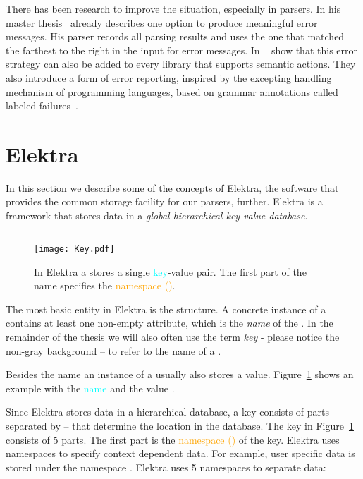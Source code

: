 There has been research to improve the situation, especially in  parsers. In his master thesis~\cite{ford2002packrat} \citeauthor{ford2002packrat} already describes one option to produce meaningful error messages. His parser records all parsing results and uses the one that matched the farthest to the right in the input for error messages. In ~\cite{maidl2016labeled} \citeauthor{maidl2016labeled} show that this error strategy can also be added to every  library that supports semantic actions. They also introduce a form of error reporting, inspired by the excepting handling mechanism of programming languages, based on grammar annotations called labeled failures~\cite{maidl2016labeled}.

\section{Elektra}

In this section we describe some of the concepts of Elektra, the software that provides the common storage facility for our  parsers, further. Elektra is a framework that stores data in a \emph{global hierarchical key-value database}.

\subsection{}

\begin{figure}
  \centering
    \texttt{[image: Key.pdf]}
  \caption{In Elektra a  stores a single \textcolor{Aqua}{key}-\textcolor{Purple3}{value} pair. The first part of the name specifies the \textcolor{orange}{namespace ()}.}
  \label{fig:key}
\end{figure}

The most basic entity in Elektra is the  structure. A concrete instance of a  contains at least one non-empty attribute, which is the \emph{name} of the . In the remainder of the thesis we will also often use the term \emph{key} - please notice the non-gray background – to refer to the name of a .

Besides the name an instance of a  usually also stores a value. Figure~\ref{fig:key} shows an example  with the \textcolor{Aqua}{name}  and the \textcolor{Purple3}{value} .

Since Elektra stores data in a hierarchical database, a key consists of parts – separated by \code{/} – that determine the location in the database. The key in Figure~\ref{fig:key} consists of 5 parts. The first part  is the \textcolor{orange}{namespace ()} of the key. Elektra uses namespaces to specify context dependent data. For example, user specific data is stored under the namespace . Elektra uses 5 namespaces to separate data:

